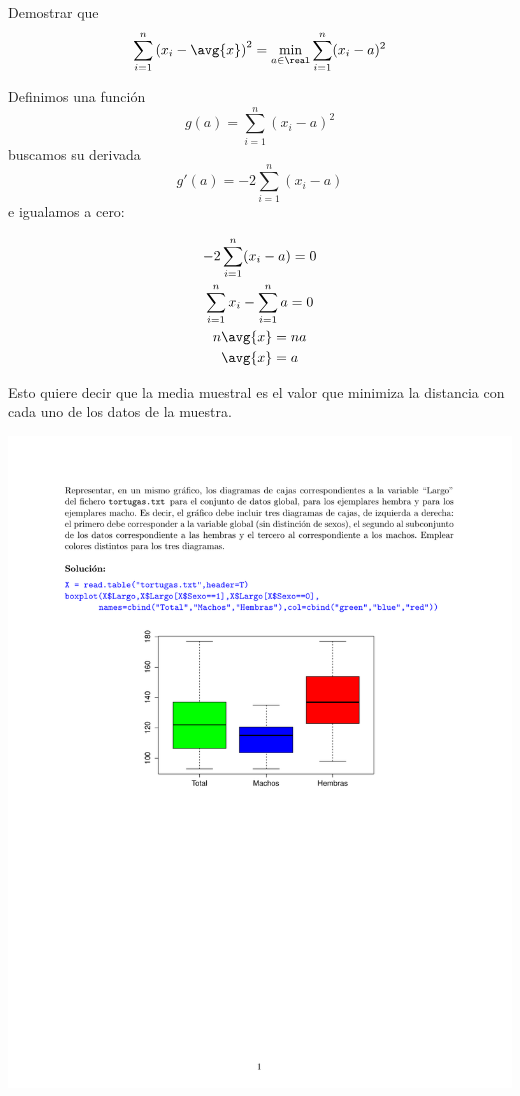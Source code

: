 \begin{problem}[2] Demostrar que \[ \sum_{i=1}^n \left(x_i-\avg{x}\right)^2 = \min_{a\in \real} \sum_{i=1}^n(x_i-a)^2 \]

\solution

Definimos una función \[ g(a) = \sum_{i=1}^n(x_i-a)^2 \] buscamos su derivada \[ g'(a) = -2 \sum_{i=1}^n(x_i-a) \] e igualamos a cero:

\begin{gather*}
-2 \sum_{i=1}^n(x_i-a) = 0 \\
\sum_{i=1}^n x_i - \sum_{i=1}^n a = 0 \\
n \avg{x} = n a \\
\avg{x} = a 
\end{gather*}

Esto quiere decir que la media muestral es el valor que minimiza la distancia con cada uno de los datos de la muestra.
\end{problem}

\newpage
\begin{problem}[3]
\solution
\centerline{\includegraphics[page=1,scale=0.8328]{pdf/_Solucion_T1P3.pdf}} %
\end{problem}
\newpage

